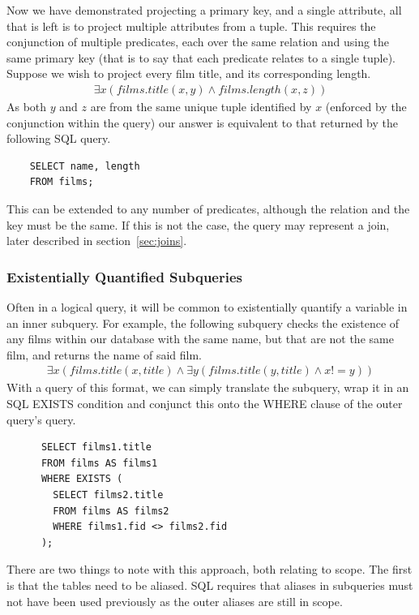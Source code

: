 \documentclass[a4paper, 11pt]{article}
\begin{document}
    Now we have demonstrated projecting a primary key, and a single attribute,
    all that is left is to project multiple attributes from a tuple. This
    requires the conjunction of multiple predicates, each over the same
    relation and using the same primary key (that is to say that each predicate
    relates to a single tuple). Suppose we wish to project
    every film title, and its corresponding length.
    \begin{gather}
      \exists x(films.title(x, y) \land films.length(x, z))
    \end{gather}
    As both $y$ and $z$ are from the same unique tuple identified by $x$
    (enforced by the conjunction within the query) our
    answer is equivalent to that returned by the following SQL query.
    \begin{verbatim}
    SELECT name, length
    FROM films;
    \end{verbatim}
    This can be extended to any number of predicates, although the relation and
    the key must be the same. If this is not the case, the query may represent
    a join, later described in section~\ref{sec:joins}.

    \subsubsection{Existentially Quantified Subqueries}
    \label{sec:existential}
    Often in a logical query, it will be common to existentially quantify a
    variable in an inner subquery. For example, the following subquery checks
    the existence of any films within our database with the same name, but that
    are not the same film, and returns the name of said film.
    \begin{gather}
      \exists x(films.title(x, title) \land \exists y(films.title(y,
      title) \land x != y))
    \end{gather}
    With a query of this format, we can simply translate the subquery, wrap it
    in an SQL EXISTS condition and conjunct this onto the WHERE clause of the
    outer query's query.

    \begin{verbatim}
      SELECT films1.title
      FROM films AS films1
      WHERE EXISTS (
        SELECT films2.title
        FROM films AS films2
        WHERE films1.fid <> films2.fid
      );
    \end{verbatim}

    There are two things to note with this approach, both relating to scope.
    The first is that the tables need to be aliased. SQL requires that aliases
    in subqueries must not have been used previously as the outer aliases are
    still in scope.
    
\end{document}
